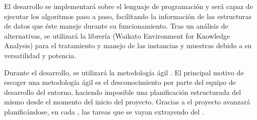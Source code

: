 El desarrollo se implementará sobre el lenguaje de programación \javaversion{} y será capaz de ejecutar los algoritmos paso a paso, facilitando la información de las estructuras de datos que éste maneje durante su funcionamiento. Tras un análisis de alternativas, se utilizará la librería \weka{} (Waikato Environment for Knowledge Analysis) para el tratamiento y manejo de las instancias y muestras debido a su versatilidad y potencia.

Durante el desarrollo, se utilizará la metodología ágil \scrum{}. El principal motivo de escoger una metodología ágil es el desconocimiento por parte del equipo de desarrollo del entorno, haciendo imposible una planificación estructurada del mismo desde el momento del inicio del proyecto. Gracias a \scrum{} el proyecto avanzará planificándose, en cada \sprint{}, las tareas que se vayan extrayendo del \productbacklog{}.
